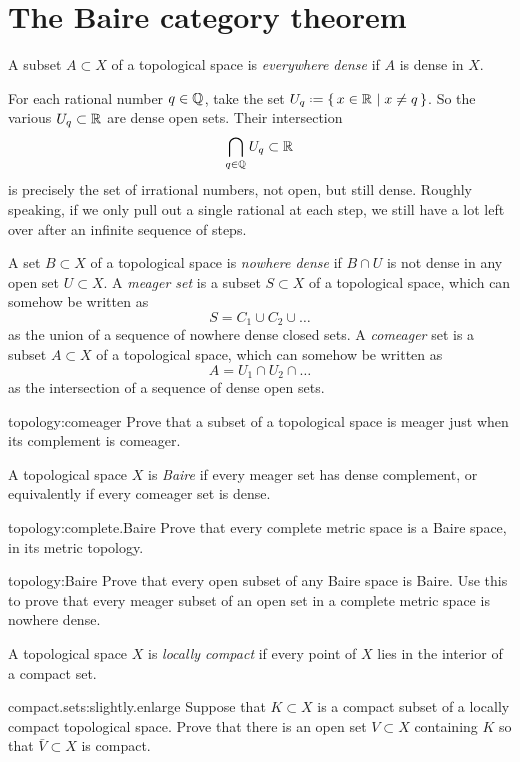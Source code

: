 \section{The Baire category theorem}
A subset \(A \subset X\) of a topological space is \emph{everywhere dense} if \(A\) is dense in \(X\).
\begin{example}
For each rational number \(q \in \mathbb{Q}^{}\), take the set \(U_q \defeq \set{x \in \R{}|x \ne q}\).
So the various \(U_q \subset \mathbb{R}^{}\) are dense open sets.
Their intersection 
\[
\bigcap_{q \in \mathbb{Q}^{}} U_q \subset \mathbb{R}^{}
\]
is precisely the set of irrational numbers, not open, but still dense.
Roughly speaking, if we only pull out a single rational at each step, we still have a lot left over after an infinite sequence of steps.
\end{example}
A set \(B \subset X\) of a topological space is \emph{nowhere dense} if \(B \cap U\) is not dense in any open set \(U \subset X\).
A \emph{meager set} is a subset \(S \subset X\) of a topological space, which can somehow be written as
\[
S = C_1 \cup C_2 \cup \dots
\]
as the union of a sequence of nowhere dense closed sets.
A \emph{comeager} set is a subset \(A \subset X\) of a topological space, which can somehow be written as
\[
A = U_1 \cap U_2 \cap \dots
\]
as the intersection of a sequence of dense open sets.
\begin{problem}{topology:comeager}
Prove that a subset of a topological space is meager just when its complement is comeager.
\end{problem}
A topological space \(X\) is \emph{Baire} if every meager set has dense complement, or equivalently if every comeager set is dense.
\begin{problem}{topology:complete.Baire}
Prove that every complete metric space is a Baire space, in its metric topology.
\end{problem}
\begin{problem}{topology:Baire}
Prove that every open subset of any Baire space is Baire.
Use this to prove that every meager subset of an open set in a complete metric space is nowhere dense.
\end{problem}
A topological space \(X\) is \emph{locally compact} if every point of \(X\) lies in the interior of a compact set.
\begin{problem}{compact.sets:slightly.enlarge}
Suppose that \(K \subset X\) is a compact subset of a locally compact topological space.
Prove that there is an open set \(V \subset X\) containing \(K\) so that \(\bar{V} \subset X\) is compact.
\end{problem}
